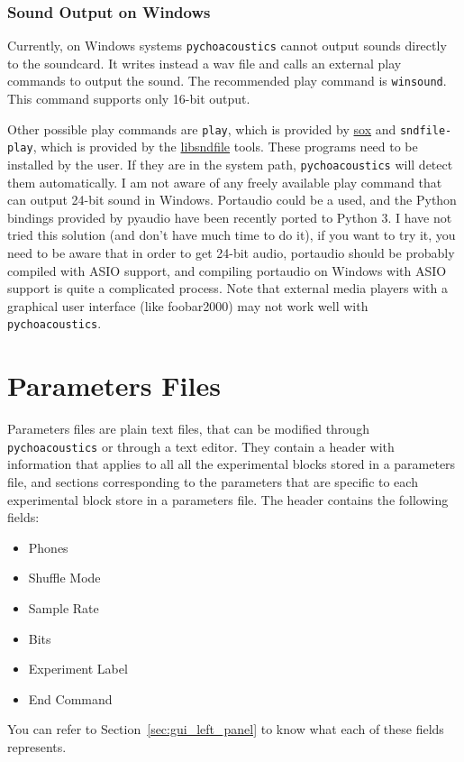 \subsubsection{Sound Output on Windows}
Currently, on Windows systems \texttt{pychoacoustics} cannot output sounds directly to the soundcard.
It writes instead a wav file and calls an external play commands to output the sound. The recommended 
play command is \texttt{winsound}. This command supports only 16-bit
output. 

Other possible play commands are \texttt{play}, which is provided by \href{http://sox.sourceforge.net/}{sox} 
and \texttt{sndfile-play}, which is provided by the \href{http://www.mega-nerd.com/libsndfile/}{libsndfile} tools. These programs need 
to be installed by the user. If they are in the system path, \texttt{pychoacoustics} will detect them automatically. 
I am not aware of any freely available play command that can output 24-bit sound in Windows. 
Portaudio could be a used, and the Python bindings provided by pyaudio have been recently ported to Python 3. 
I have not tried this solution (and don't have much time to do it), if you want to try it, you need to be aware that in order to get 24-bit audio, 
portaudio should be probably compiled with ASIO support, and compiling portaudio on Windows with ASIO support is quite a complicated process.
Note that external media players with a graphical user interface (like foobar2000) may not work well
with \texttt{pychoacoustics}. 


\section{Parameters Files}
\label{sec:parameters_files}
Parameters files are plain text files, that can be modified through \texttt{pychoacoustics} or through a text editor. They contain a header with information that applies to all all the experimental blocks stored in a parameters file, and sections corresponding to the parameters that are specific to each experimental block store in a parameters file.
The header contains the following fields:
\begin{itemize}
\item Phones
\item Shuffle Mode
\item Sample Rate
\item Bits
\item Experiment Label
\item End Command
\end{itemize}
You can refer to Section~\ref{sec:gui_left_panel} to know what each of these fields represents.

